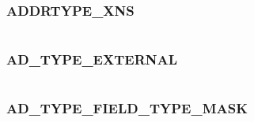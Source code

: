 \documentclass[letterpaper,10pt,english]{sphinxmanual}
\begin{document}
\subsubsection{ADDRTYPE\_XNS}
\label{appdev/refs/macros/ADDRTYPE_XNS::doc}\label{appdev/refs/macros/ADDRTYPE_XNS:addrtype-xns-data}\label{appdev/refs/macros/ADDRTYPE_XNS:addrtype-xns}

\begin{fulllineitems}
\label{appdev/refs/macros/ADDRTYPE_XNS:ADDRTYPE_XNS}
\end{fulllineitems}


\begin{tabulary}{\linewidth}{|L|L|}
\hline

 & 
\\\hline
\end{tabulary}



\subsubsection{AD\_TYPE\_EXTERNAL}
\label{appdev/refs/macros/AD_TYPE_EXTERNAL:ad-type-external-data}\label{appdev/refs/macros/AD_TYPE_EXTERNAL::doc}\label{appdev/refs/macros/AD_TYPE_EXTERNAL:ad-type-external}

\begin{fulllineitems}
\label{appdev/refs/macros/AD_TYPE_EXTERNAL:AD_TYPE_EXTERNAL}
\end{fulllineitems}


\begin{tabulary}{\linewidth}{|L|L|}
\hline

 & 
\\\hline
\end{tabulary}



\subsubsection{AD\_TYPE\_FIELD\_TYPE\_MASK}
\label{appdev/refs/macros/AD_TYPE_FIELD_TYPE_MASK:ad-type-field-type-mask}\label{appdev/refs/macros/AD_TYPE_FIELD_TYPE_MASK::doc}\label{appdev/refs/macros/AD_TYPE_FIELD_TYPE_MASK:ad-type-field-type-mask-data}
\end{document}
